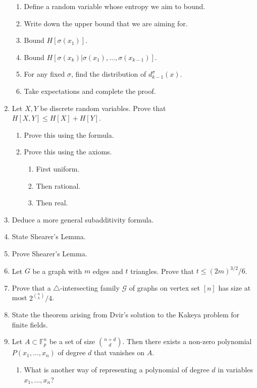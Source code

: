 \documentclass[10pt]{article}
\newcommand{\mc}[1]{\mathcal{#1}}
\newcommand{\bb}[1]{\mathbb{#1}}
\begin{document}
\begin{enumerate}
    \begin{enumerate}
        \item Define a random variable whose entropy we aim to bound.
        \item Write down the upper bound that we are aiming for.
        \item Bound $H[\sigma(x_1)]$.
        \item Bound $H[\sigma(x_k)|\sigma(x_1),\dots,\sigma(x_{k-1})]$.
        \item For any fixed $\sigma$, find the distribution of $d^\sigma_{k-1}(x)$.
        \item Take expectations and complete the proof.
    \end{enumerate}
    \item Let $X,Y$ be discrete random variables. Prove that $H[X,Y] \le H[X] + H[Y]$.
    \begin{enumerate}
        \item Prove this using the formula.
        \item Prove this using the axioms.
        \begin{enumerate}
            \item First uniform.
            \item Then rational.
            \item Then real.
        \end{enumerate}
    \end{enumerate}
    \item Deduce a more general subadditivity formula.
    \item State Shearer's Lemma.
    \item Prove Shearer's Lemma.
    \item Let $G$ be a graph with $m$ edges and $t$ triangles. Prove that $t\le (2m)^{3/2}/6$.
    \item Prove that a $\triangle$-intersecting family $\mc{G}$ of graphs on vertex set $[n]$ has size at most $2^{n\choose k}/4$.
    \item State the theorem arising from Dvir's solution to the Kakeya problem for finite fields.
    \item Let $A\subset \bb{F}_p^n$ be a set of size ${n+d\choose d}$. Then there exists a non-zero polynomial $P(x_1,\dots,x_n)$ of degree $d$ that vanishes on $A$.
    \begin{enumerate}
        \item What is another way of representing a polynomial of degree $d$ in variables $x_1,\dots,x_n$?

\end{enumerate}
\end{enumerate}
\end{document}
